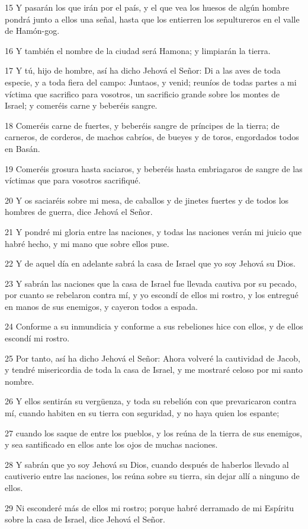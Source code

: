 \par 15 Y pasarán los que irán por el país, y el que vea los huesos de algún hombre pondrá junto a ellos una señal, hasta que los entierren los sepultureros en el valle de Hamón-gog.
\par 16 Y también el nombre de la ciudad será Hamona; y limpiarán la tierra.
\par 17 Y tú, hijo de hombre, así ha dicho Jehová el Señor: Di a las aves de toda especie, y a toda fiera del campo: Juntaos, y venid; reuníos de todas partes a mi víctima que sacrifico para vosotros, un sacrificio grande sobre los montes de Israel; y comeréis carne y beberéis sangre.
\par 18 Comeréis carne de fuertes, y beberéis sangre de príncipes de la tierra; de carneros, de corderos, de machos cabríos, de bueyes y de toros, engordados todos en Basán.
\par 19 Comeréis grosura hasta saciaros, y beberéis hasta embriagaros de sangre de las víctimas que para vosotros sacrifiqué.
\par 20 Y os saciaréis sobre mi mesa, de caballos y de jinetes fuertes y de todos los hombres de guerra, dice Jehová el Señor. 
\par 21 Y pondré mi gloria entre las naciones, y todas las naciones verán mi juicio que habré hecho, y mi mano que sobre ellos puse.
\par 22 Y de aquel día en adelante sabrá la casa de Israel que yo soy Jehová su Dios.
\par 23 Y sabrán las naciones que la casa de Israel fue llevada cautiva por su pecado, por cuanto se rebelaron contra mí, y yo escondí de ellos mi rostro, y los entregué en manos de sus enemigos, y cayeron todos a espada.
\par 24 Conforme a su inmundicia y conforme a sus rebeliones hice con ellos, y de ellos escondí mi rostro.
\par 25 Por tanto, así ha dicho Jehová el Señor: Ahora volveré la cautividad de Jacob, y tendré misericordia de toda la casa de Israel, y me mostraré celoso por mi santo nombre.
\par 26 Y ellos sentirán su vergüenza, y toda su rebelión con que prevaricaron contra mí, cuando habiten en su tierra con seguridad, y no haya quien los espante;
\par 27 cuando los saque de entre los pueblos, y los reúna de la tierra de sus enemigos, y sea santificado en ellos ante los ojos de muchas naciones.
\par 28 Y sabrán que yo soy Jehová su Dios, cuando después de haberlos llevado al cautiverio entre las naciones, los reúna sobre su tierra, sin dejar allí a ninguno de ellos.
\par 29 Ni esconderé más de ellos mi rostro; porque habré derramado de mi Espíritu sobre la casa de Israel, dice Jehová el Señor.

